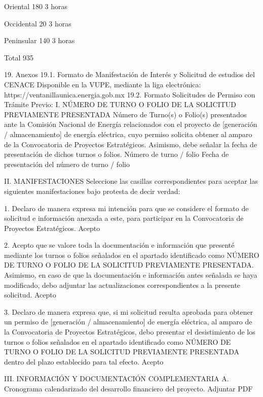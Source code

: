  Oriental
 180
 3 horas
 
 Occidental
 20
 3 horas
 
 Peninsular
 140
 3 horas
 
 Total
 935
 
 
 
19. Anexos
19.1. Formato de Manifestación de Interés y Solicitud de estudios del CENACE
Disponible en la VUPE, mediante la liga electrónica: https://ventanillaunica.energia.gob.mx
19.2. Formato Solicitudes de Permiso con Trámite Previo:
I. NÚMERO DE TURNO O FOLIO DE LA SOLICITUD PREVIAMENTE PRESENTADA
Número de Turno(s) o Folio(s) presentados ante la Comisión Nacional de Energía relacionados con el proyecto de [generación / almacenamiento] de energía eléctrica, cuyo permiso solicita obtener al amparo de la Convocatoria de Proyectos Estratégicos. Asimismo, debe señalar la fecha de presentación de dichos turnos o folios.
 Número de turno / folio
 Fecha de presentación del número de turno / folio
 
 
 
 
 
 
II. MANIFESTACIONES
Seleccione las casillas correspondientes para aceptar las siguientes manifestaciones bajo protesta de decir verdad:
 
 1. Declaro de manera expresa mi intención para que se considere el formato de solicitud e información anexada a este, para participar en la Convocatoria de Proyectos Estratégicos.
  Acepto
 
 2. Acepto que se valore toda la documentación e información que presenté mediante los turnos o folios señalados en el apartado identificado como NÚMERO DE TURNO O FOLIO DE LA SOLICITUD PREVIAMENTE PRESENTADA.
Asimismo, en caso de que la documentación e información antes señalada se haya modificado, debo adjuntar las actualizaciones correspondientes a la presente solicitud.
  Acepto
 
 3. Declaro de manera expresa que, si mi solicitud resulta aprobada para obtener un permiso de [generación / almacenamiento] de energía eléctrica, al amparo de la Convocatoria de Proyectos Estratégicos, debo presentar el desistimiento de los turnos o folios señalados en el apartado identificado como NÚMERO DE TURNO O FOLIO DE LA SOLICITUD PREVIAMENTE PRESENTADA dentro del plazo establecido para tal efecto.
  Acepto
 
 
III. INFORMACIÓN Y DOCUMENTACIÓN COMPLEMENTARIA
A. Cronograma calendarizado del desarrollo financiero del proyecto.
 Adjuntar PDF
 
